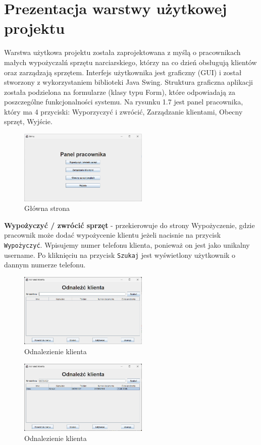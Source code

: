 \section{Prezentacja warstwy użytkowej projektu}
Warstwa użytkowa projektu została zaprojektowana z myślą o pracownikach małych wypożyczalń sprzętu narciarskiego, którzy na co dzień obsługują klientów oraz zarządzają sprzętem. Interfejs użytkownika jest graficzny (GUI) i został stworzony z wykorzystaniem biblioteki Java Swing. Struktura graficzna aplikacji została podzielona na formularze (klasy typu Form), które odpowiadają za poszczególne funkcjonalności systemu.
\newline
Na rysunku 1.7 jest panel pracownika, który ma 4 przyciski: Wyporzyczyć i zwrócić, Zarządzanie klientami, Obecny sprzęt, Wyjście.
\begin{figure}[H]
    \centering
    \includegraphics[width=0.55\textwidth]{figures/menu.jpg}
    \caption{Główna strona}
\end{figure}
    
    \par\textbf{Wypożyczyć / zwrócić sprzęt} - przekierowuje do strony Wypożyczenie, gdzie pracownik może dodać wypożycenie klientu jeżeli nacisnie na przycisk \texttt{Wypożyczyć}.
    Wpisujemy numer telefonu klienta, ponieważ on jest jako unikalny username. Po kliknięciu na przycisk \texttt{Szukaj} jest wyświetlony użytkownik o dannym numerze telefonu.
    \begin{figure}[h]
        \centering
        \includegraphics[width=0.55\textwidth]{figures/odn.jpg}
        \caption{Odnalezienie klienta}
    \end{figure}
    \begin{figure}[H]
        \centering
        \includegraphics[width=0.55\textwidth]{figures/odn2.jpg}
        \caption{Odnalezienie klienta}
    \end{figure}

